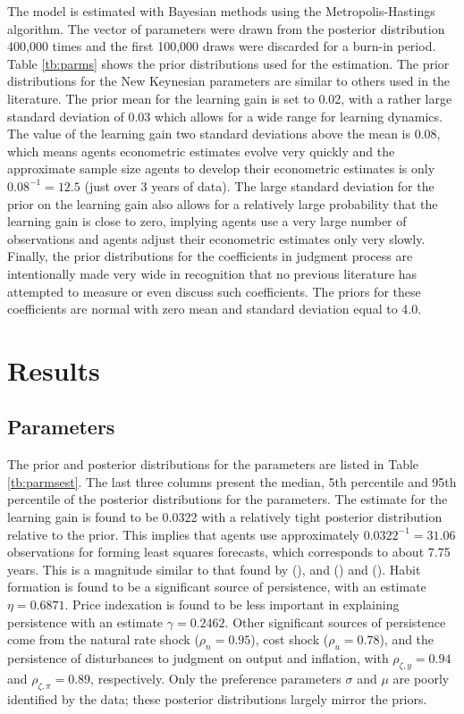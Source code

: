 \documentclass[12pt]{article}
\newcommand{\citee}[1]{\citename{#1} (\citeyear{#1})}
\begin{document}
{The model is estimated with Bayesian methods using the Metropolis-Hastings algorithm.  The vector of parameters were drawn from the posterior distribution 400,000 times and the first 100,000 draws were discarded for a burn-in period.  Table \ref{tb:parms} shows the prior distributions used for the estimation.  The prior distributions for the New Keynesian parameters are similar to others used in the literature.  The prior mean for the learning gain is set to 0.02, with a rather large standard deviation of 0.03 which allows for a wide range for learning dynamics.  The value of the learning gain two standard deviations above the mean is 0.08, which means agents econometric estimates evolve very quickly and the approximate sample size agents to develop their econometric estimates is only $0.08^{-1} = 12.5$ (just over 3 years of data).  The large standard deviation for the prior on the learning gain also allows for a relatively large probability that the learning gain is close to zero, implying agents use a very large number of observations and agents adjust their econometric estimates only very slowly.  Finally, the prior distributions for the coefficients in judgment process are intentionally made very wide in recognition that no previous literature has attempted to measure or even discuss such coefficients.  The priors for these coefficients are normal with zero mean and standard deviation equal to 4.0.   

\section{Results}
\subsection{Parameters}
The prior and posterior distributions for the parameters are listed in Table \ref{tb:parmsest}.  The last three columns present the median, 5th percentile and 95th percentile of the posterior distributions for the parameters.  The estimate for the learning gain is found to be 0.0322 with a relatively tight posterior distribution relative to the prior.  This implies that agents use approximately $0.0322^{-1} = 31.06$ observations for forming least squares forecasts, which corresponds to about 7.75 years.  This is a magnitude similar to that found by \citee{milani2007}, and \citee{slobodyan_wouters_2007} and (\citeyear{slobodyan_wouters_2008}).  Habit formation is found to be a significant source of persistence, with an estimate $\eta=0.6871$.  Price indexation is found to be less important in explaining persistence with an estimate $\gamma=0.2462$.  Other significant sources of persistence come from the natural rate shock ($\rho_n = 0.95$), cost shock ($\rho_u=0.78$), and the persistence of disturbances to judgment on output and inflation, with $\rho_{\zeta,y}=0.94$ and $\rho_{\zeta,\pi}=0.89$, respectively.  Only the preference parameters $\sigma$ and $\mu$ are poorly identified by the data; these posterior distributions largely mirror the priors. 

}
\end{document}
